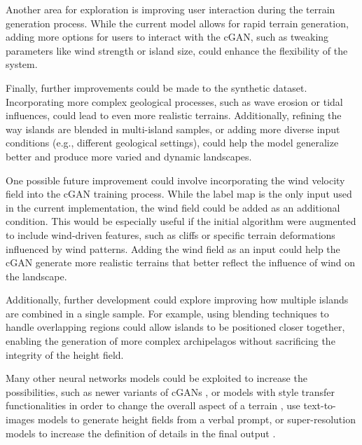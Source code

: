 Another area for exploration is improving user interaction during the terrain generation process. While the current model allows for rapid terrain generation, adding more options for users to interact with the cGAN, such as tweaking parameters like wind strength or island size, could enhance the flexibility of the system.

Finally, further improvements could be made to the synthetic dataset. Incorporating more complex geological processes, such as wave erosion or tidal influences, could lead to even more realistic terrains. Additionally, refining the way islands are blended in multi-island samples, or adding more diverse input conditions (e.g., different geological settings), could help the model generalize better and produce more varied and dynamic landscapes.


One possible future improvement could involve incorporating the wind velocity field into the cGAN training process. While the label map is the only input used in the current implementation, the wind field could be added as an additional condition. This would be especially useful if the initial algorithm were augmented to include wind-driven features, such as cliffs or specific terrain deformations influenced by wind patterns. Adding the wind field as an input could help the cGAN generate more realistic terrains that better reflect the influence of wind on the landscape.

Additionally, further development could explore improving how multiple islands are combined in a single sample. For example, using blending techniques to handle overlapping regions could allow islands to be positioned closer together, enabling the generation of more complex archipelagos without sacrificing the integrity of the height field.

Many other neural networks models could be exploited to increase the possibilities, such as newer variants of cGANs \cite{Park2019}, or models with style transfer functionalities \cite{Gatys2015,Zhu2020} in order to change the overall aspect of a terrain \cite{Perche2023a,Perche2023b}, use text-to-images models \cite{Rombach2021,Radford2021} to generate height fields from a verbal prompt, or super-resolution models \cite{Dong2014} to increase the definition of details in the final output \cite{Guerin2016a}.
